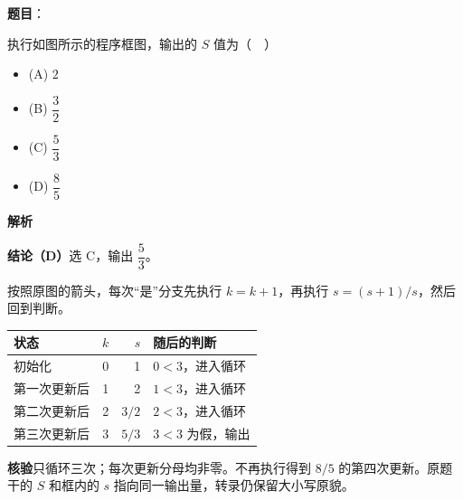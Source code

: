 \begin{answer}

\textbf{题目}：

执行如图所示的程序框图，输出的 $S$ 值为（　）
\nopagebreak[4]
\begin{center}\end{center}
\nopagebreak[4]
\begin{itemize}
\item (A) $2$
\item (B) $\dfrac32$
\item (C) $\dfrac53$
\item (D) $\dfrac85$
\end{itemize}

\textbf{解析}

\textbf{结论（D）}选 C，输出 $\dfrac53$。

按照原图的箭头，每次“是”分支先执行 $k=k+1$，再执行 $s=(s+1)/s$，然后回到判断。

\begin{center}
\begin{tabular}{lrrl}
\toprule
状态 & $k$ & $s$ & 随后的判断 \\
\midrule
初始化 & 0 & 1 & $0<3$，进入循环 \\
第一次更新后 & 1 & 2 & $1<3$，进入循环 \\
第二次更新后 & 2 & $3/2$ & $2<3$，进入循环 \\
第三次更新后 & 3 & $5/3$ & $3<3$ 为假，输出 \\
\bottomrule
\end{tabular}
\end{center}

\textbf{核验}只循环三次；每次更新分母均非零。不再执行得到 $8/5$ 的第四次更新。原题干的 $S$ 和框内的 $s$ 指向同一输出量，转录仍保留大小写原貌。


\end{answer}
